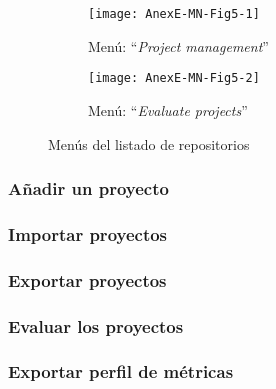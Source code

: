 \begin{figure}[h]
	\centering
	\begin{subfigure}{.45\textwidth}
		\centering
		\texttt{[image: AnexE-MN-Fig5-1]}
		\caption{Menú: ``\textit{Project management}''}
		\label{fig:AnexE-MN-Fig5-1}
	\end{subfigure}\hfill
	\begin{subfigure}{.45\textwidth}
		\centering
		\texttt{[image: AnexE-MN-Fig5-2]}
		\caption{Menú: ``\textit{Evaluate projects}''}
		\label{fig:AnexE-MN-Fig5-2}
	\end{subfigure}
	\caption{Menús del listado de repositorios}
	\label{fig:AnexE-MN-Fig5}
\end{figure}
\subsubsection{Añadir un proyecto}
\subsubsection{Importar proyectos}
\subsubsection{Exportar proyectos}
\subsubsection{Evaluar los proyectos}
\subsubsection{Exportar perfil de métricas}